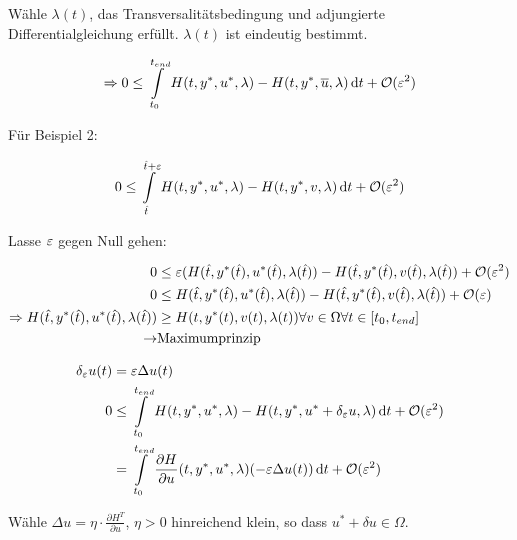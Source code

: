 Wähle $\lambda(t)$, das Transversalitätsbedingung und adjungierte Differentialgleichung erfüllt. $\lambda(t)$ ist eindeutig bestimmt.

\begin{align*}
\Rightarrow 0 &\leq \int\limits_{t_0}^{t_{end}} H(t, y^*, u^*, \lambda) - H(t, y^*, \overline u, \lambda) \,\mathrm d t + \mathcal O(\varepsilon^2) \\
\end{align*}

Für Beispiel 2:

\begin{align*}
0 & \leq \int\limits_{\hat t}^{\hat t + \varepsilon} H(t, y^*, u^*, \lambda) - H(t, y^*, v, \lambda) \,\mathrm d t + \mathcal O(\varepsilon^2) \\
\end{align*}

Lasse $\varepsilon$ gegen Null gehen:


\begin{align*}
0 & \leq \varepsilon(H(\hat t, y^*(\hat t), u^*(\hat t), \lambda(\hat t)) - H({\hat t}, y^*({\hat t}), v({\hat t}), \lambda({\hat t})) + \mathcal O(\varepsilon^2) \\
0 & \leq H({\hat t}, y^*({\hat t}), u^*({\hat t}), \lambda({\hat t})) - H({\hat t}, y^*({\hat t}), v({\hat t}), \lambda({\hat t})) + \mathcal O(\varepsilon) \\
\Rightarrow H({\hat t}, y^*({\hat t}), u^*({\hat t}), \lambda({\hat t})) & \geq H(t, y^*(t), v(t), \lambda(t)) \forall v \in \Omega \forall t \in [t_0, {t_{end}}] \\
\to & \text{Maximumprinzip}
\end{align*}


\begin{align*}
\delta_\varepsilon u(t) &= \varepsilon \Delta u(t) \\
0 & \leq \int\limits_{t_0}^{t_{end}} H(t, y^*, u^*, \lambda) - H(t, y^*, u^* + \delta_\varepsilon u, \lambda) \,\mathrm d t + \mathcal O(\varepsilon^2) \\
&= \int\limits_{t_0}^{t_{end}} \frac{\partial H}{\partial u} (t, y^*, u^*, \lambda) ( - \varepsilon \Delta u(t)) \,\mathrm d t + \mathcal O(\varepsilon^2)
\end{align*}

Wähle $\Delta u = \eta \cdot \frac{\partial H^T}{\partial u}$, $\eta > 0$ hinreichend klein, so dass $u^* + \delta u \in \Omega$.

